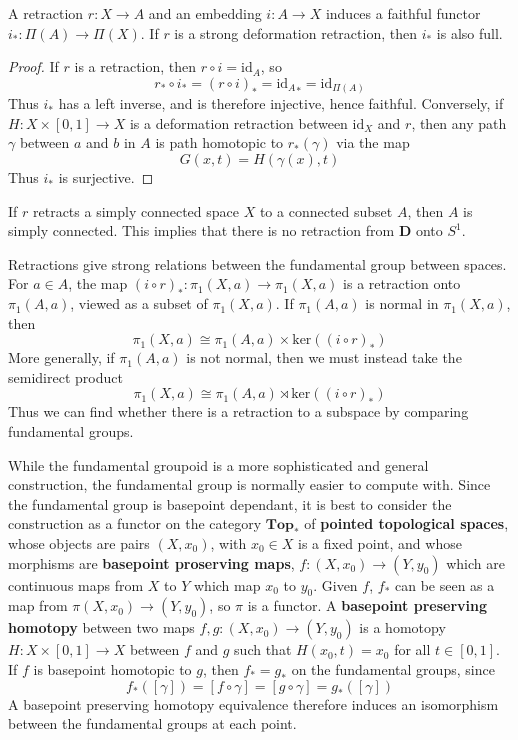 \begin{theorem}
    A retraction $r: X \to A$ and an embedding $i: A \to X$ induces a faithful functor $i_*: \Pi(A) \to \Pi(X)$. If $r$ is a strong deformation retraction, then $i_*$ is also full.
\end{theorem}
\begin{proof}
    If $r$ is a retraction, then $r \circ i = \text{id}_A$, so
    \[ r_* \circ i_* = (r \circ i)_* = {\text{id}_A}_* = \text{id}_{\Pi(A)} \]
    Thus $i_*$ has a left inverse, and is therefore injective, hence faithful. Conversely, if $H: X \times [0,1] \to X$ is a deformation retraction between $\text{id}_X$ and $r$, then any path $\gamma$ between $a$ and $b$ in $A$ is path homotopic to $r_*(\gamma)$ via the map
    \[ G(x,t) = H(\gamma(x),t) \]
    Thus $i_*$ is surjective.
\end{proof}

\begin{example}
    If $r$ retracts a simply connected space $X$ to a connected subset $A$, then $A$ is simply connected. This implies that there is no retraction from $\mathbf{D}$ onto $S^1$.
\end{example}

Retractions give strong relations between the fundamental group between spaces. For $a \in A$, the map $(i \circ r)_*: \pi_1(X,a) \to \pi_1(X,a)$ is a retraction onto $\pi_1(A,a)$, viewed as a subset of $\pi_1(X,a)$. If $\pi_1(A,a)$ is normal in $\pi_1(X,a)$, then
%
\[ \pi_1(X,a) \cong \pi_1(A,a) \times \text{ker}((i \circ r)_*) \]
%
More generally, if $\pi_1(A,a)$ is not normal, then we must instead take the semidirect product
%
\[ \pi_1(X,a) \cong \pi_1(A,a) \rtimes \text{ker}((i \circ r)_*) \]
%
Thus we can find whether there is a retraction to a subspace by comparing fundamental groups.

While the fundamental groupoid is a more sophisticated and general construction, the fundamental group is normally easier to compute with. Since the fundamental group is basepoint dependant, it is best to consider the construction as a functor on the category $\textbf{Top}_*$ of {\bf pointed topological spaces}, whose objects are pairs $(X,x_0)$, with $x_0 \in X$ is a fixed point, and whose morphisms are {\bf basepoint proserving maps}, $f: (X,x_0) \to (Y,y_0)$ which are continuous maps from $X$ to $Y$ which map $x_0$ to $y_0$. Given $f$, $f_*$ can be seen as a map from $\pi(X,x_0) \to (Y,y_0)$, so $\pi$ is a functor. A {\bf basepoint preserving homotopy} between two maps $f,g: (X,x_0) \to (Y,y_0)$ is a homotopy $H: X \times [0,1] \to X$ between $f$ and $g$ such that $H(x_0, t) = x_0$ for all $t \in [0,1]$. If $f$ is basepoint homotopic to $g$, then $f_* = g_*$ on the fundamental groups, since
%
\[ f_*([\gamma]) = [f \circ \gamma] = [g \circ \gamma] = g_*([\gamma]) \]
%
A basepoint preserving homotopy equivalence therefore induces an isomorphism between the fundamental groups at each point.


